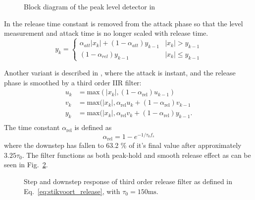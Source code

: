 \documentclass[../main2.tex]{subfiles}
\providecommand{\rootdir}{..}
\begin{document}
\begin{figure}
\centerline{}
\caption{Block diagram of the peak level detector in \cite{mcnally1984dynamic}}
\label{fig:block_mcnally_theory_peak}
\end{figure}

In \cite{zolzer2008digital} the release time constant is removed from the attack phase so that the level measurement and attack time is no longer scaled with release time.
\begin{equation}
y_k = \begin{cases}
    \alpha_{att} |x_k| + (1-\alpha_{att}) y_{k-1} 	& |x_k| > y_{k-1} \\
    (1-\alpha_{rel}) y_{k-1} 					& |x_k| \leq y_{k-1}
\end{cases}
\end{equation}

Another variant is described in \cite{stikvoort1986digital}, where the attack is instant, and the release phase is smoothed by a third order IIR filter:\begin{equation}\label{eq:stikvoort_release}
\begin{split}
u_k &= \text{max}(|x_k|, (1-\alpha_{\text{rel}}) u_{k-1}) \\
v_k &= \text{max}(|x_k|, \alpha_{\text{rel}} u_k + (1-\alpha_{\text{rel}}) v_{k-1} \\
y_k &= \text{max}(|x_k|, \alpha_{\text{rel}} v_k + (1-\alpha_{\text{rel}}) y_{k-1}. \\
\end{split}
\end{equation}
The time constant $\alpha_{\text{rel}}$ is defined as
\begin{equation}
\alpha_\text{rel} = 1-e^{-1/\tau_0 f_s}
\end{equation}
where the downstep has fallen to 63.2 \% of it's final value after approximately $3.25 \tau_0$. The filter functions as both peak-hold and smooth release effect as can be seen in Fig.~\ref{fig:step_stikvoort_release}.
\begin{figure}
\centerline{}
\caption{Step and downstep response of third order release filter as defined in Eq.~\eqref{eq:stikvoort_release}, with $\tau_0 = 150 \text{ms}$.}
\label{fig:step_stikvoort_release}
\end{figure}
\end{document}
